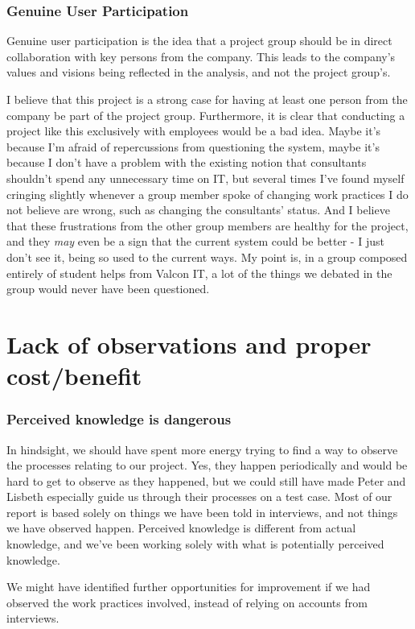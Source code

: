 \subsubsection{Genuine User Participation}
Genuine user participation is the idea that a project group should be in direct collaboration with key persons from the company. This leads to the company's values and visions being reflected in the analysis, and not the project group's.

I believe that this project is a strong case for having at least one person from the company be part of the project group. Furthermore, it is clear that conducting a project like this exclusively with employees would be a bad idea. Maybe it's because I'm afraid of repercussions from questioning the system, maybe it's because I don't have a problem with the existing notion that consultants shouldn't spend any unnecessary time on IT, but several times I've found myself cringing slightly whenever a group member spoke of changing work practices I do not believe are wrong, such as changing the consultants' status.
And I believe that these frustrations from the other group members are healthy for the project, and they \emph{may} even be a sign that the current system could be better - I just don't see it, being so used to the current ways. My point is, in a group composed entirely of student helps from Valcon IT, a lot of the things we debated in the group would never have been questioned.


\section*{Lack of observations and proper cost/benefit}
\subsubsection{Perceived knowledge is dangerous}
In hindsight, we should have spent more energy trying to find a way to observe the processes relating to our project. Yes, they happen periodically and would be hard to get to observe as they happened, but we could still have made Peter and Lisbeth especially guide us through their processes on a test case. Most of our report is based solely on things we have been told in interviews, and not things we have observed happen. Perceived knowledge is different from actual knowledge, and we've been working solely with what is potentially perceived knowledge.

We might have identified further opportunities for improvement if we had observed the work practices involved, instead of relying on accounts from interviews.

